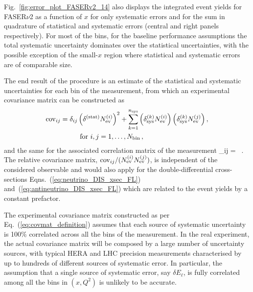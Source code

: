 Fig.~\ref{fig:error_plot_FASERv2_14} also displays
the integrated event yields for FASER$\nu$2 as a function of $x$ for only
systematic errors and for the sum in quadrature of statistical and systematic errors
(central and right panels respectively).
%
For most of the bins, for the baseline performance assumptions the total systematic
uncertainty dominates over the statistical uncertainties, with the possible exception
of the small-$x$ region where statistical and systematic errors are of comparable size.

The end result of the procedure is an estimate of the statistical and systematic uncertainties
for each bin of the measurement, from which an experimental covariance matrix can be constructed as
\begin{align}
	\label{eq:covmat_definition}
	{\rm cov}_{ij} =\delta_{ij} & \left( \delta^{\rm (stat)}  N_{\rm ev}^{(i)}\right)^2
	+ \sum_{k=1}^{n_{\rm sys}}\left( \delta_{\rm sys}^{(k)} N_{\rm ev}^{(i)} \right) \left( \delta_{\rm sys}^{(k)} N_{\rm ev}^{(j)} \right),
	\nonumber\\ 
	& \text{ for } i,j=1,\ldots,N_{\rm bin} \, ,
\end{align}
and the same for the associated correlation
matrix of the measurement
\be
\label{eq:corrmat_definition}
\rho_{ij} =   \, . 
\ee
The relative covariance matrix, $ {\rm cov}_{ij}/( N_{\rm ev}^{(i)}N_{\rm ev}^{(j)})$, is
independent of the considered observable and would also apply
for the double-differential cross-sections Eqns.~(\ref{eq:neutrino_DIS_xsec_FL}) and~(\ref{eq:antineutrino_DIS_xsec_FL}) which are related to the event yields by a constant prefactor.

The experimental covariance matrix constructed as per
Eq.~(\ref{eq:covmat_definition}) assumes that each source of systematic
uncertainty is 100\% correlated across all the bins of the measurement.
%
In the real experiment, the actual covariance matrix will be
composed by a large number of uncertainty sources, with typical
HERA and LHC precision measurements characterised by up to hundreds
of different sources of systematic error.
%
In particular, the assumption that a single source of systematic error, say $\delta E_\ell$,
is fully correlated among all the bins in $(x,Q^2)$ is unlikely to be accurate.

